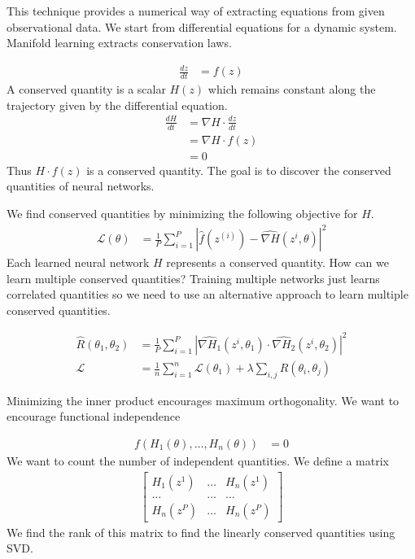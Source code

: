 \documentclass[book.tex]{subfiles}
\begin{document}
This technique provides a numerical way of extracting equations from given observational data. We start from differential equations for a dynamic system. Manifold learning extracts conservation laws.

\begin{align}
 \frac{dz}{dt} &= f(z)
\end{align}
A conserved quantity is a scalar $H(z)$ which remains constant along the trajectory given by the differential equation.
\begin{align}
    \frac{d H}{dt} &= \nabla H \cdot \frac{dz}{dt} \\
    &= \nabla H \cdot f(z) \\
    &= 0
\end{align}
Thus $H \cdot f(z)$ is a conserved quantity. The goal is to discover the conserved quantities of neural networks.

We find conserved quantities by minimizing the following objective for $H$.
\begin{align}
\mathcal{L}(\theta) &= \frac{1}{P} \sum_{i=1}^P |\hat{f}(z^{(i)}) - \hat{\nabla H}(z^i, \theta)|^2
\end{align}
Each learned neural network $H$ represents a conserved quantity. How can we learn multiple conserved quantities? Training multiple networks just learns correlated quantities so we need to use an alternative approach to learn multiple conserved quantities.

\begin{align}
\hat{R}(\theta_1, \theta_2) &= \frac{1}{P} \sum_{i=1}^P |\hat{\nabla H_1}(z^i, \theta_1) \cdot \hat{\nabla H_2}(z^i, \theta_2)|^2\\
\mathcal{L} &= \frac{1}{n} \sum_{i=1}^n \mathcal{L}(\theta_1) + \lambda \sum_{i,j} R(\theta_i, \theta_j)
\end{align}

Minimizing the inner product encourages maximum orthogonality. We want to encourage functional independence

\begin{align}
    f(H_1(\theta),\dotsc, H_n(\theta)) &= 0
\end{align}
We want to count the number of independent quantities. We define a matrix
\begin{align}
    \begin{bmatrix}
    H_1(z^1) & \dotsc & H_n(z^1) \\
    \dotsc & \dotsc & \dotsc \\
    H_n(z^P) & \dotsc & H_n(z^P)
    \end{bmatrix}
\end{align}
We find the rank of this matrix to find the linearly conserved quantities using SVD.
\end{document}
